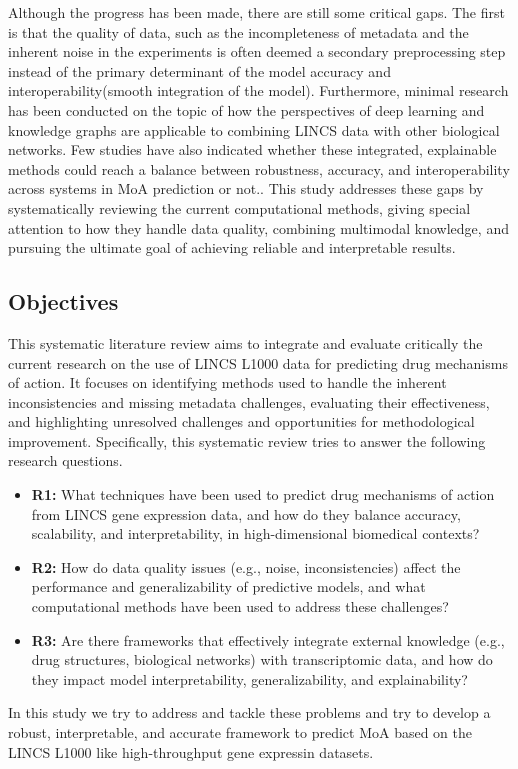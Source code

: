 \documentclass[twocolumn,12pt,a4paper]{article}
\begin{document}
Although the progress has been made, there are still some critical gaps. The first is that the quality of data, such as the incompleteness of metadata and the inherent noise in the experiments is often deemed a secondary preprocessing step instead of the primary determinant of the model accuracy and interoperability(smooth integration of the model)\cite{stathias2018sustainable}. Furthermore, minimal research has been conducted on the topic of how the perspectives of deep learning and knowledge graphs are applicable to combining LINCS data with other biological networks. Few studies have also indicated whether these integrated, explainable methods could reach a balance between robustness, accuracy, and interoperability across systems in MoA prediction or not.\cite{ye2025knowledge,evangelista2023toxicology,wu2022deep}. This study addresses these gaps by systematically reviewing the current computational methods, giving special attention to how they handle data quality, combining multimodal knowledge, and pursuing the ultimate goal of achieving reliable and interpretable results.

\subsection{Objectives}
This systematic literature review aims to integrate and evaluate critically the current research on the use of LINCS L1000 data for predicting drug mechanisms of action. It focuses on identifying methods used to handle the inherent inconsistencies and missing metadata challenges, evaluating their effectiveness, and highlighting unresolved challenges and opportunities for methodological improvement. Specifically, this systematic review tries to answer the following research questions.
\begin{itemize}  
  \item \textbf{R1:} What techniques have been used to predict drug mechanisms of action from LINCS gene expression data, and how do they balance accuracy, scalability, and interpretability, in high-dimensional biomedical contexts?
  \item \textbf{R2:} How do data quality issues (e.g., noise, inconsistencies) affect the performance and generalizability of predictive models, and what computational methods have been used to address these challenges?
  \item \textbf{R3:} Are there frameworks that effectively integrate external knowledge (e.g., drug structures, biological networks) with transcriptomic data, and how do they impact model interpretability, generalizability, and explainability?
\end{itemize}
In this study we try to address and tackle these problems and try to develop a robust, interpretable, and accurate framework to predict MoA based on the LINCS L1000 like high-throughput gene expressin datasets.
\end{document}

